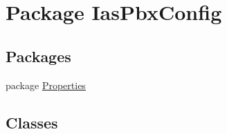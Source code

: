 \hypertarget{namespace_ias_pbx_config}{
\section{Package IasPbxConfig}
\label{namespace_ias_pbx_config}
}
\subsection*{Packages}
\begin{DoxyCompactItemize}
\item 
package \hyperlink{namespace_ias_pbx_config_1_1_properties}{Properties}
\end{DoxyCompactItemize}
\subsection*{Classes}
